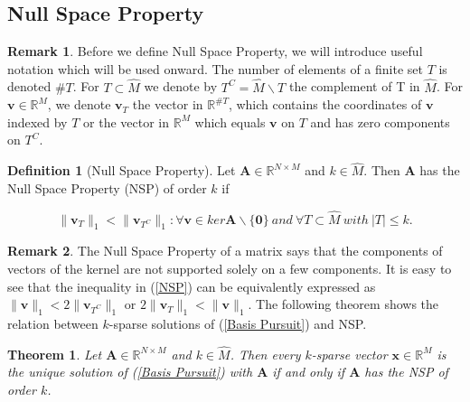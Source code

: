 \documentclass[11pt,oneside,czech,american]{book} %
\theoremstyle{plain}
\newtheorem{thm}{Theorem}
\theoremstyle{definition}
\newtheorem{defn}{Definition}
\newtheorem{rmrk}{Remark}
\begin{document}
\subsection*{Null Space Property}

\begin{rmrk}
	Before we define Null Space Property, we will introduce useful notation which will be used onward. The number of elements of a finite set $T$ is denoted $\#T$. For $T\subset \hat{M}$ we denote by $T^{C} = \hat{M} \backslash T$ the complement of T in $\hat{M}$. For $\bm{v} \in \mathbb{R}^M$, we denote $\bm{v}_{T}$ the vector in $\mathbb{R}^{\#T}$, which contains the coordinates of $\bm{v}$ indexed by $T$ or the vector in $\mathbb{R}^{M}$ which equals $\bm{v}$ on $T$ and has zero components on $T^{C}$. %
\end{rmrk}

\begin{defn}[Null Space Property]
	Let $\bm{A} \in \mathbb{R}^{N \times M}$ and $k \in \hat{M}$. Then $\bm{A}$ has the Null Space Property (NSP) of order $k$ if
	
	\begin{equation}
		\lVert \bm{v}_{T}\rVert_{1} <  \lVert \bm{v}_{{T}^{C}}\rVert_{1}: \forall \bm{v} \in ker \bm{A} \backslash \{\bm{0}\} \ and \ \forall T \subset \hat{M} \ with \ |T|\leq k. \label{NSP}
	\end{equation}
	
\end{defn}

\begin{rmrk}
	The Null Space Property of a matrix says that the components of vectors of the kernel are not supported solely on a few components. It is easy to see that the inequality in (\ref{NSP}) can be equivalently expressed as $\lVert \bm{v}\rVert_{1} <  2\lVert \bm{v}_{{T}^{C}}\rVert_{1}$ or $2\lVert \bm{v}_{T}\rVert_{1} <  \lVert \bm{v}\rVert_{1}$. The following theorem shows the relation between $k$-sparse solutions of (\ref{Basis Pursuit}) and NSP.
\end{rmrk}

\begin{thm}
	Let $\bm{A} \in \mathbb{R}^{N \times M}$ and $k \in \hat{M}$. Then every $k$-sparse vector $\bm{x} \in \mathbb{R}^{M}$ is the unique solution of (\ref{Basis Pursuit}) with $\bm{A}$ if and only if $\bm{A}$ has the NSP of order $k$.
\end{thm}
\end{document}
